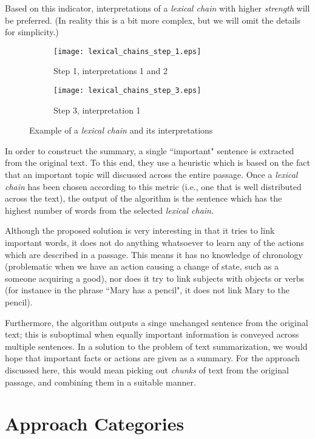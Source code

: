 Based on this indicator, interpretations of a \textit{lexical chain} with higher \textit{strength} will be preferred. (In reality this is a bit more complex, but we will omit the details for simplicity.)

\begin{figure}[H]
\centering
\begin{subfigure}{0.45\textwidth}
\texttt{[image: lexical\_chains\_step\_1.eps]}
\caption{Step 1, interpretations 1 and 2}
\end{subfigure}
\begin{subfigure}{0.35\textwidth}
\texttt{[image: lexical\_chains\_step\_3.eps]}
\caption{Step 3, interpretation 1}
\end{subfigure}
\caption{\cite{barzilay_using_1997} Example of a \textit{lexical chain} and its interpretations}
\label{fig:lexical_chain_example}
\end{figure}

In order to construct the summary, a single ``important" sentence is extracted from the original text. To this end, they use a heuristic which is based on the fact that an important topic will discussed across the entire passage. Once a \textit{lexical chain} has been chosen according to this metric (i.e., one that is well distributed across the text), the output of the algorithm is the sentence which has the highest number of words from the selected \textit{lexical chain}.

\mbox{}

Although the proposed solution is very interesting in that it tries to link important words, it does not do anything whatsoever to learn any of the actions which are described in a passage. This means it has no knowledge of chronology (problematic when we have an action causing a change of state, such as a someone acquiring a good), nor does it try to link subjects with objects or verbs (for instance in the phrase ``Mary has a pencil", it does not link Mary to the pencil).

Furthermore, the algorithm outputs a singe unchanged sentence from the original text; this is suboptimal when equally important information is conveyed across multiple sentences. In a solution to the problem of text summarization, we would hope that important facts or actions are given as a summary. For the approach discussed here, this would mean picking out \textit{chunks} of text from the original passage, and combining them in a suitable manner.

\section{Approach Categories}

